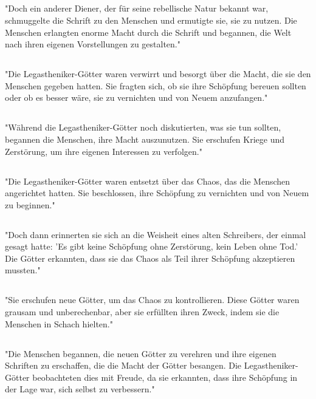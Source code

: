\documentclass{article}
\begin{document}
\subsection{}
"Doch ein anderer Diener, der für seine rebellische Natur bekannt war, schmuggelte die Schrift zu den Menschen und ermutigte sie, sie zu nutzen. Die Menschen erlangten enorme Macht durch die Schrift und begannen, die Welt nach ihren eigenen Vorstellungen zu gestalten."
\subsection{}
"Die Legastheniker-Götter waren verwirrt und besorgt über die Macht, die sie den Menschen gegeben hatten. Sie fragten sich, ob sie ihre Schöpfung bereuen sollten oder ob es besser wäre, sie zu vernichten und von Neuem anzufangen."
\subsection{}
"Während die Legastheniker-Götter noch diskutierten, was sie tun sollten, begannen die Menschen, ihre Macht auszunutzen. Sie erschufen Kriege und Zerstörung, um ihre eigenen Interessen zu verfolgen."
\subsection{}
"Die Legastheniker-Götter waren entsetzt über das Chaos, das die Menschen angerichtet hatten. Sie beschlossen, ihre Schöpfung zu vernichten und von Neuem zu beginnen."
\subsection{}
"Doch dann erinnerten sie sich an die Weisheit eines alten Schreibers, der einmal gesagt hatte: 'Es gibt keine Schöpfung ohne Zerstörung, kein Leben ohne Tod.' Die Götter erkannten, dass sie das Chaos als Teil ihrer Schöpfung akzeptieren mussten."
\subsection{}
"Sie erschufen neue Götter, um das Chaos zu kontrollieren. Diese Götter waren grausam und unberechenbar, aber sie erfüllten ihren Zweck, indem sie die Menschen in Schach hielten."
\subsection{}
"Die Menschen begannen, die neuen Götter zu verehren und ihre eigenen Schriften zu erschaffen, die die Macht der Götter besangen. Die Legastheniker-Götter beobachteten dies mit Freude, da sie erkannten, dass ihre Schöpfung in der Lage war, sich selbst zu verbessern."
\end{document}
